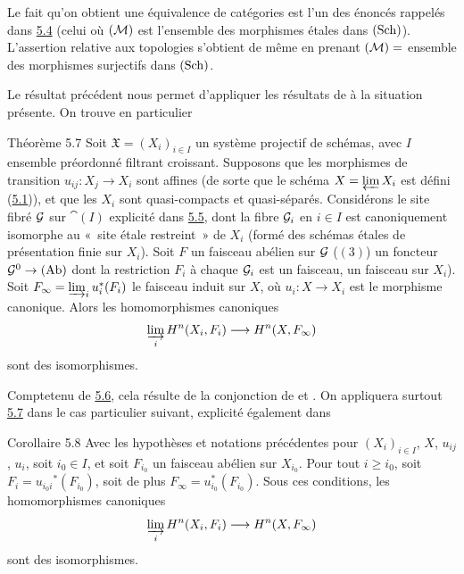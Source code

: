 \documentclass[10pt]{../fichiers-configuration-latex/smfart}
\begin{document}
Le fait qu'on obtient une équivalence de catégories est l'un des
énoncés rappelés dans \hyperref[VII.subsec5.4]{5.4} (celui où $({\mathcal M})$ est
l'ensemble des morphismes étales dans $(\operatorname{Sch})$). L'assertion
relative aux topologies s'obtient de même en prenant $({\mathcal M})=$
ensemble des morphismes surjectifs dans $(\operatorname{Sch})$.

Le résultat précédent nous permet d'appliquer les résultats de à la
situation présente. On trouve en particulier

\begin{enonce*}{Théorème 5.7}
Soit $\mathfrak{X} = (X_i)_{i \in I}$ un système projectif de
schémas, avec $I$ ensemble préordonné filtrant croissant. Supposons
que les morphismes de transition $u_{ij} : X_j \to X_i$ sont affines
(de sorte que le schéma $X = \varprojlim X_i$ est défini
(\hyperref[VII.subsec5.1]{5.1})), et que les $X_i$ sont quasi-compacts et
quasi-séparés. Considérons le site fibré ${\mathcal G}$ sur $\cat(I)$
explicité dans \hyperref[VII.subsec5.5]{5.5}, dont la fibre ${\mathcal G}_i$ en $i \in
I$ est canoniquement isomorphe au « site étale restreint » de
$X_i$ (formé des schémas étales de présentation finie sur $X_i$).
Soit $F$ un faisceau abélien sur ${\mathcal G}$ (\ie $(3)$) un foncteur
$\Gg^{0} \to (\Ab)$ dont la restriction $F_i$ à chaque ${\mathcal G}_i$ est
un faisceau, \ie un faisceau sur $X_i$). Soit $F_{\infty} =
\varinjlim_{i} u^{\ast}_i (F_i)$ le faisceau induit sur $X$, où
$u_i : X \to X_i$ est le morphisme canonique. Alors les
homomorphismes canoniques
$$
\varinjlim_i H^n (X_i, F_i) \to H^n (X, F_{\infty})
$$
sont des isomorphismes.
\end{enonce*}

Compte\pageoriginale tenu de \hyperref[VII.lem5.6]{5.6}, cela résulte de la conjonction de
 et .
On appliquera surtout \hyperref[VII.thm5.7]{5.7} dans le cas particulier suivant,
explicité également dans

\begin{enonce*}{Corollaire 5.8}
Avec les hypothèses et notations précédentes pour $(X_i)_{i \in I}$,
$X$, $u_{ij}$, $u_i$, soit $i_0 \in I$, et soit $F_{i_0}$ un faisceau
abélien sur $X_{i_0}$. Pour tout $i \geq i_0$, soit $F_i = u_{i_0 i}
{}^{\ast}(F_{i_0})$, soit de plus $F_{\infty} = u^{\ast}_{i_0}
(F_{i_0})$. Sous ces conditions, les homomorphismes canoniques
$$
\varinjlim_i H^n (X_i, F_i) \to H^n (X, F_{\infty})
$$
sont des isomorphismes.
\end{enonce*}
\end{document}
